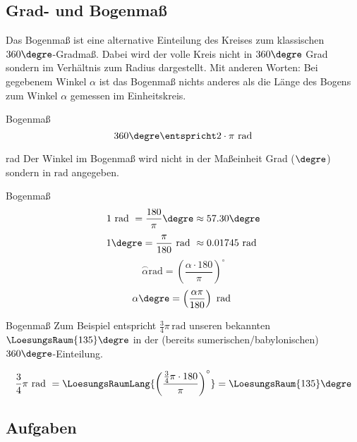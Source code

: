 
\subsection{Grad- und Bogenmaß}


Das Bogenmaß ist eine alternative Einteilung des Kreises zum
klassischen $360\degre$-Gradmaß. Dabei wird der volle Kreis nicht in
$360\degre$ Grad sondern im Verhältnis zum Radius dargestellt. Mit
anderen Worten: Bei gegebenem Winkel $\alpha$ ist das Bogenmaß nichts
anderes als die Länge des Bogens zum Winkel $\alpha$ gemessen im Einheitskreis.


\begin{definition}{Bogenmaß}{}
$$360\degre \entspricht 2\cdot\pi \text{\,\,rad}$$
\end{definition}

\begin{bemerkung}{rad}{}
Der Winkel im Bogenmaß wird nicht in der Maßeinheit Grad (${}\degre$)
sondern in $\text{rad}$ angegeben.
\end{bemerkung}

\begin{gesetz}{Bogenmaß}{}
$$1 \text{ rad } = \frac{180}{\pi}\degre \approx 57.30\degre$$
$$1\degre = \frac{\pi}{180} \text{ rad } \approx 0.01745 \text{ rad }$$
$$\stackrel{\frown}{\alpha} \text{rad} = \left(\frac{\alpha\cdot{}180}{\pi}\right)^\circ$$
$$\alpha\degre = \left(\frac{\alpha\pi}{180}\right) \text{ rad }$$  
\end{gesetz}
\newpage
\begin{beispiel}{Bogenmaß}{}
 Zum Beispiel entspricht
$\frac{3}{4}\pi\,\text{rad}$ unseren bekannten $\LoesungsRaum{135}\degre$ in der
(bereits sumerischen/babylonischen) $360\degre$-Einteilung.

 $$\frac34\pi \text{ rad } = \LoesungsRaumLang{\left(\frac{\frac34\pi\cdot{}180}{\pi}\right)^\circ} = \LoesungsRaum{135}\degre$$
\end{beispiel}



\subsection*{Aufgaben}





\newpage
